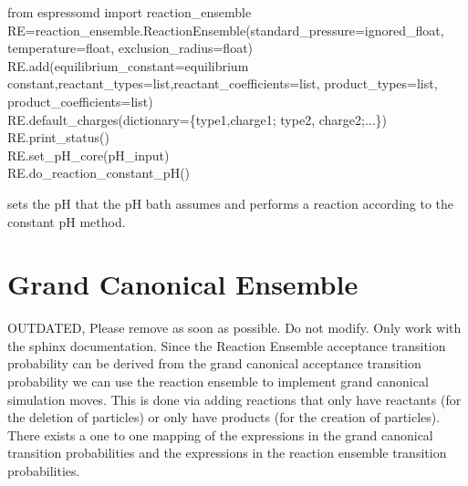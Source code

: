   \begin{pysyntax}
  	from espressomd import reaction_ensemble \\
  	RE=reaction_ensemble.ReactionEnsemble(standard_pressure=ignored_float, temperature=float, exclusion_radius=float) \\
  	RE.add(equilibrium_constant=equilibrium constant,reactant_types=list,reactant_coefficients=list, product_types=list, product_coefficients=list) \\
  	RE.default_charges(dictionary=\{type1,charge1; type2, charge2;...\}) \\
	RE.print_status() \\
	 RE.set_pH_core(pH_input) \\
	 RE.do_reaction_constant_pH() 
	\begin{features}
	\end{features}
\end{pysyntax}


 sets the pH that the pH bath assumes and  performs a reaction according to the constant pH method.


\section{Grand Canonical Ensemble}
OUTDATED, Please remove as soon as possible. Do not modify. Only work with the sphinx documentation.
Since the Reaction Ensemble acceptance transition probability can be derived from the grand canonical acceptance transition probability we can use the reaction ensemble to implement grand canonical simulation moves. This is done via adding reactions that only have reactants (for the deletion of particles) or only have products (for the creation of particles). There exists a one to one mapping of the expressions in the grand canonical transition probabilities and the expressions in the reaction ensemble transition probabilities.
